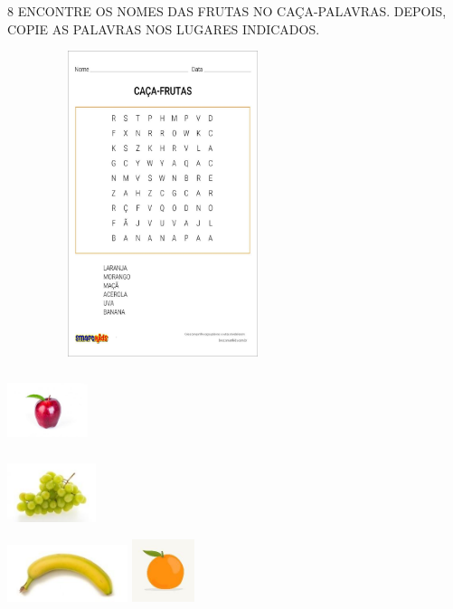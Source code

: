 
\num{8} ENCONTRE OS NOMES DAS FRUTAS NO CAÇA-PALAVRAS. DEPOIS, COPIE AS PALAVRAS NOS LUGARES INDICADOS.


\includegraphics[width=3.58333in,height=3.51667in]{media/image97.jpg}

\includegraphics[width=0.92708in,height=0.84375in]{media/image98.jpg}

\includegraphics[width=1.02083in,height=0.67986in]{media/image99.jpg}

\includegraphics[width=1.38958in,height=0.65208in]{media/image100.jpg}
\includegraphics[width=0.71875in,height=0.71875in]{media/image101.jpg}

